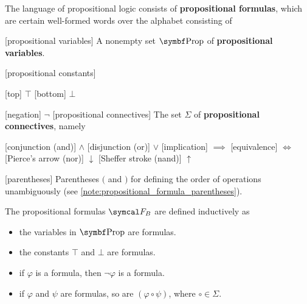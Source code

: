 \begin{definition}\label{def:propositional_logic_language}\cite[12]{Nerode2012}
  The language of propositional logic consists of \textbf{propositional formulas}, which are certain well-formed words over the alphabet consisting of
  \begin{description}
    [propositional variables] A nonempty set \( \Bold{Prop} \) of \textbf{propositional variables}.

    [propositional constants]\mbox{}
    \begin{description}
      [top] \( \top \)
      [bottom] \( \bot \)
    \end{description}

    [negation] \( \neg \)
    [propositional connectives] The set \( \Sigma \) of \textbf{propositional connectives}, namely
    \begin{description}
      [conjunction (and)] \( \land \)
      [disjunction (or)] \( \lor \)
      [implication] \( \implies \)
      [equivalence] \( \iff \)
      [Pierce's arrow (nor)] \( \downarrow \)
      [Sheffer stroke (nand)] \( \uparrow \)
    \end{description}

    [parentheses] Parentheses \( ( \) and \( ) \) for defining the order of operations unambiguously (see \cref{note:propositional_formula_parentheses}).
  \end{description}

  The propositional formulas \( \Cal{F}_B \) are defined inductively as
  \begin{itemize}
    \item the variables in \( \Bold{Prop} \) are formulas.
    \item the constants \( \top \) and \( \bot \) are formulas.
    \item if \( \varphi \) is a formula, then \( \neg \varphi \) is a formula.
    \item if \( \varphi \) and \( \psi \) are formulas, so are \( (\varphi \circ \psi) \), where \( \circ \in \Sigma \).
  \end{itemize}


\end{definition}
